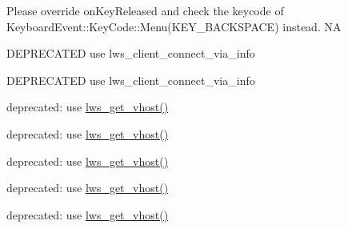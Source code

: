 \begin{DoxyRefList}
Please override on\+Key\+Released and check the keycode of Keyboard\+Event\+::\+Key\+Code\+::\+Menu(\+K\+E\+Y\+\_\+\+B\+A\+C\+K\+S\+P\+A\+C\+E) instead.  NA  
\item[\label{deprecated__deprecated000418}%
\Hypertarget{deprecated__deprecated000418}%
Member \hyperlink{group__client_ga4af0a20108a95e8b6d94dd4d80055ff3}{lws\+\_\+client\+\_\+connect} (struct \hyperlink{structlws__context}{lws\+\_\+context} $\ast$clients, const char $\ast$address, int port, int ssl\+\_\+connection, const char $\ast$path, const char $\ast$host, const char $\ast$origin, const char $\ast$protocol, int ietf\+\_\+version\+\_\+or\+\_\+minus\+\_\+one) L\+W\+S\+\_\+\+W\+A\+R\+N\+\_\+\+D\+E\+P\+R\+E\+C\+A\+T\+ED]D\+E\+P\+R\+E\+C\+A\+T\+ED use lws\+\_\+client\+\_\+connect\+\_\+via\+\_\+info  
\item[\label{deprecated__deprecated000419}%
\Hypertarget{deprecated__deprecated000419}%
Member \hyperlink{group__client_gac6a8558b4410961a880241c2ac1271e2}{lws\+\_\+client\+\_\+connect\+\_\+extended} (struct \hyperlink{structlws__context}{lws\+\_\+context} $\ast$clients, const char $\ast$address, int port, int ssl\+\_\+connection, const char $\ast$path, const char $\ast$host, const char $\ast$origin, const char $\ast$protocol, int ietf\+\_\+version\+\_\+or\+\_\+minus\+\_\+one, void $\ast$userdata) L\+W\+S\+\_\+\+W\+A\+R\+N\+\_\+\+D\+E\+P\+R\+E\+C\+A\+T\+ED]D\+E\+P\+R\+E\+C\+A\+T\+ED use lws\+\_\+client\+\_\+connect\+\_\+via\+\_\+info  
\item[\label{deprecated__deprecated000417}%
\Hypertarget{deprecated__deprecated000417}%
Member \hyperlink{group__context-and-vhost_gabcdf4ec43fd1a3c18d1dbf42f13ae08d}{lws\+\_\+vhost\+\_\+get} (struct lws $\ast$wsi) L\+W\+S\+\_\+\+W\+A\+R\+N\+\_\+\+D\+E\+P\+R\+E\+C\+A\+T\+ED]deprecated\+: use \hyperlink{group__context-and-vhost_ga26bb300d01fa3e443d4ccdf384e99c7f}{lws\+\_\+get\+\_\+vhost()} 

deprecated\+: use \hyperlink{group__context-and-vhost_ga26bb300d01fa3e443d4ccdf384e99c7f}{lws\+\_\+get\+\_\+vhost()} 

deprecated\+: use \hyperlink{group__context-and-vhost_ga26bb300d01fa3e443d4ccdf384e99c7f}{lws\+\_\+get\+\_\+vhost()} 

deprecated\+: use \hyperlink{group__context-and-vhost_ga26bb300d01fa3e443d4ccdf384e99c7f}{lws\+\_\+get\+\_\+vhost()} 

deprecated\+: use \hyperlink{group__context-and-vhost_ga26bb300d01fa3e443d4ccdf384e99c7f}{lws\+\_\+get\+\_\+vhost()} 


\end{DoxyRefList}
